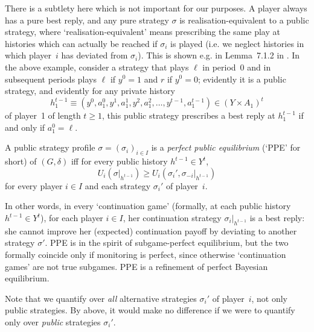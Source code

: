 \begin{remark}
	There is a subtlety here which is not important for our purposes. A player always has a pure best reply, and any pure strategy $\sigma$ is realisation-equivalent to a public strategy, where `realisation-equivalent' means prescribing the same play at histories which can actually be reached if $\sigma_i$ is played (i.e. we neglect histories in which player~$i$ has deviated from $\sigma_i$). This is shown e.g. in Lemma~7.1.2 in \textcite{MailathSamuelson2006}. In the above example, consider a strategy that plays $\ell$ in period~0 and in subsequent periods plays $\ell$ if $y^0=1$ and $r$ if $y^0=0$; evidently it is a public strategy, and evidently for any private history
	\begin{equation*}
		h^{t-1}_1 \equiv \left(y^0,a^0_1,y^1,a^1_1,y^2,a^2_1,\dots,y^{t-1},a^{t-1}_1\right) \in (Y \times A_1)^t
	\end{equation*}
	of player~1 of length $t \geq 1$, this public strategy prescribes a best reply at $h^{t-1}_1$ if and only if $a^0_1=\ell$.
\end{remark}

\begin{definition}
	\label{definition:ppe}
	A public strategy profile $\sigma = (\sigma_i)_{i \in I}$ is a \emph{perfect public equilibrium} (`PPE' for short) of $(G,\delta)$ iff for every public history $h^{t-1} \in Y^t$,
	\begin{equation*}
		U_i\left( \sigma|_{h^{t-1}} \right)
		\geq U_i\left( \sigma_i', \sigma_{-i}|_{h^{t-1}} \right)
	\end{equation*}
	for every player $i \in I$ and each strategy $\sigma_i'$ of player~$i$.
\end{definition}

In other words, in every `continuation game' (formally, at each public history $h^{t-1} \in Y^t$), for each player $i \in I$, her continuation strategy $\sigma_i|_{h^{t-1}}$ is a best reply: she cannot improve her (expected) continuation payoff by deviating to another strategy $\sigma'$. PPE is in the spirit of subgame-perfect equilibrium, but the two formally coincide only if monitoring is perfect, since otherwise `continuation games' are not true subgames. PPE is a refinement of perfect Bayesian equilibrium.

Note that we quantify over \emph{all} alternative strategies $\sigma_i'$ of player~$i$, not only public strategies. By  above, it would make no difference if we were to quantify only over \emph{public} strategies $\sigma_i'$.

